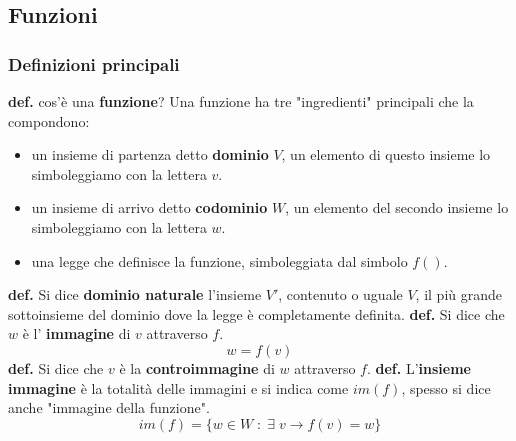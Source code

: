\subsection*{Funzioni}
\subsubsection*{Definizioni principali}
\textbf{def.} cos'è una \textbf{funzione}?
\newline
\newline
Una funzione ha tre "ingredienti" principali che la compondono:
\begin{itemize}
    \item un insieme di partenza detto \textbf{dominio} $V$, un elemento di questo insieme lo simboleggiamo con la lettera $v$.
    \item un insieme di arrivo detto \textbf{codominio} $W$, un elemento del secondo insieme lo simboleggiamo con la lettera $w$.
    \item una legge che definisce la funzione, simboleggiata dal simbolo $f()$.
\end{itemize}
\textbf{def.} Si dice \textbf{dominio naturale} l'insieme $V'$, contenuto o uguale $V$, il più grande sottoinsieme del dominio dove la legge è completamente definita.
\newline
\newline
\textbf{def.}  Si dice che $w$ è l' \textbf{immagine} di $v$ attraverso $f$.
\[
    w = f(v)
\]
\newline
\textbf{def.}  Si dice che $v$ è la \textbf{controimmagine} di $w$ attraverso $f$.
\newline
\newline
\textbf{def.} L'\textbf{insieme immagine} è la totalità delle immagini e si indica come $im(f)$, spesso si dice anche "immagine della funzione".
\[
    im(f) = \{w \in W \;:\; \exists \; v \rightarrow  f(v) = w\}
\]
